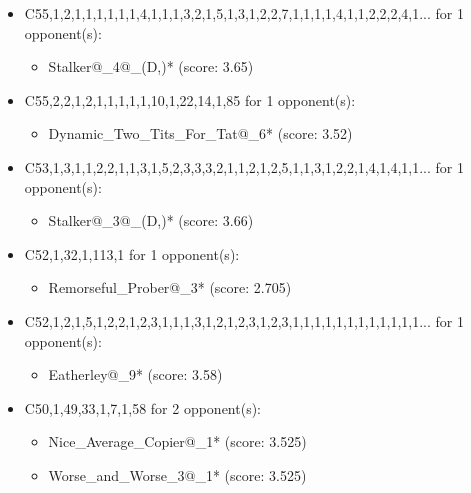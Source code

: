 \begin{appendices}
\begin{itemize}
    \item C55,1,2,1,1,1,1,1,1,4,1,1,1,3,2,1,5,1,3,1,2,2,7,1,1,1,1,4,1,1,2,2,2,4,1... for 1 opponent(s):
    \begin{multicols}{3}
         \begin{itemize}
            \item Stalker@\_4@\_(D,)* (score: 3.65)
        \end{itemize}
     \end{multicols}
     
    \item C55,2,2,1,2,1,1,1,1,1,10,1,22,14,1,85 for 1 opponent(s):
    \begin{multicols}{3}
         \begin{itemize}
            \item Dynamic\_Two\_Tits\_For\_Tat@\_6* (score: 3.52)
        \end{itemize}
     \end{multicols}
     
    \item C53,1,3,1,1,2,2,1,1,3,1,5,2,3,3,3,2,1,1,2,1,2,5,1,1,3,1,2,2,1,4,1,4,1,1... for 1 opponent(s):
    \begin{multicols}{3}
         \begin{itemize}
            \item Stalker@\_3@\_(D,)* (score: 3.66)
        \end{itemize}
     \end{multicols}
     
    \item C52,1,32,1,113,1 for 1 opponent(s):
    \begin{multicols}{3}
         \begin{itemize}
            \item Remorseful\_Prober@\_3* (score: 2.705)
        \end{itemize}
     \end{multicols}
     
    \item C52,1,2,1,5,1,2,2,1,2,3,1,1,1,3,1,2,1,2,3,1,2,3,1,1,1,1,1,1,1,1,1,1,1,1... for 1 opponent(s):
    \begin{multicols}{3}
         \begin{itemize}
            \item Eatherley@\_9* (score: 3.58)
        \end{itemize}
     \end{multicols}
     
    \item C50,1,49,33,1,7,1,58 for 2 opponent(s):
    \begin{multicols}{3}
         \begin{itemize}
            \item Nice\_Average\_Copier@\_1* (score: 3.525)
            \item Worse\_and\_Worse\_3@\_1* (score: 3.525)
        \end{itemize}
     \end{multicols}
     

\end{itemize}
\end{appendices}
